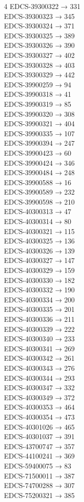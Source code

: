 \begin{multicols}{4}
EDCS-39300322 → 331\\
EDCS-39300323 → 345\\
EDCS-39300324 → 371\\
EDCS-39300325 → 389\\
EDCS-39300326 → 390\\
EDCS-39300327 → 402\\
EDCS-39300328 → 403\\
EDCS-39300329 → 442\\
EDCS-39900259 → 94\\
EDCS-39900318 → 41\\
EDCS-39900319 → 85\\
EDCS-39900320 → 308\\
EDCS-39900321 → 404\\
EDCS-39900335 → 107\\
EDCS-39900394 → 247\\
EDCS-39900423 → 60\\
EDCS-39900424 → 346\\
EDCS-39900484 → 248\\
EDCS-39900588 → 16\\
EDCS-39900589 → 232\\
EDCS-39900598 → 210\\
EDCS-40300313 → 47\\
EDCS-40300314 → 80\\
EDCS-40300321 → 115\\
EDCS-40300325 → 136\\
EDCS-40300326 → 139\\
EDCS-40300327 → 147\\
EDCS-40300329 → 159\\
EDCS-40300330 → 182\\
EDCS-40300332 → 190\\
EDCS-40300334 → 200\\
EDCS-40300335 → 201\\
EDCS-40300336 → 211\\
EDCS-40300339 → 222\\
EDCS-40300340 → 233\\
EDCS-40300341 → 269\\
EDCS-40300342 → 261\\
EDCS-40300343 → 276\\
EDCS-40300344 → 293\\
EDCS-40300347 → 332\\
EDCS-40300349 → 372\\
EDCS-40300353 → 464\\
EDCS-40300354 → 473\\
EDCS-40301026 → 465\\
EDCS-40301037 → 391\\
EDCS-43700747 → 357\\
EDCS-44100241 → 369\\
EDCS-59400075 → 83\\
EDCS-71500011 → 387\\
EDCS-74700288 → 307\\
EDCS-75200321 → 385\end{multicols}
